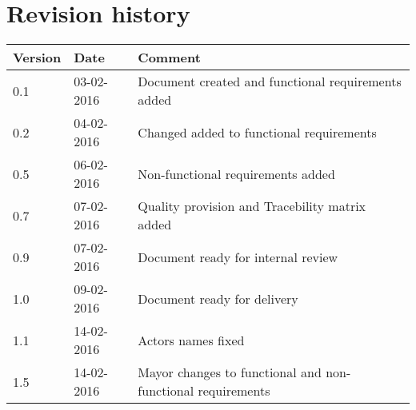 \label{chp_revisionHistory}
\chapter{Revision history}

\begin{longtable}{| p{1.5cm}  | p{3cm} |  p{8cm} | }
	\hline
	\textbf{Version} & \textbf{Date} & \textbf{Comment} \\
	\hline
	0.1 & 03-02-2016 & Document created and functional requirements added  \\
	\hline
	0.2 & 04-02-2016 & Changed added to functional requirements \\
	\hline
	0.5 & 06-02-2016 & Non-functional requirements added \\
	\hline
	0.7 & 07-02-2016 & Quality provision and Tracebility matrix added \\
	\hline
	0.9 & 07-02-2016 & Document ready for internal review \\
	\hline
	1.0 & 09-02-2016 & Document ready for delivery \\
	\hline
	1.1 & 14-02-2016 & Actors names fixed \\
	\hline
	1.5 & 14-02-2016 & Mayor changes to functional and non-functional requirements\\
	\hline
\end{longtable}

